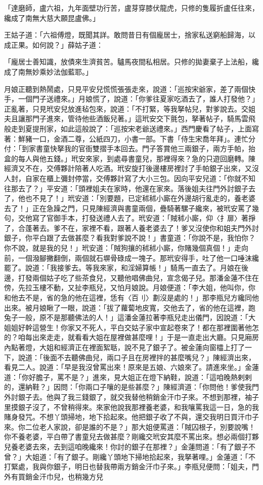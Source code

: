 「達磨師，盧六祖，九年面壁功行苦，盧芽穿膝伏龍虎，只修的隻履折盧任往來，纔成了南無大慈大願昆盧佛。」

王姑子道：「六祖傅燈，既聞其詳。敢問昔日有個龐居士，捨家私送窮船歸海，以成正果。如何說？」薛姑子道：

「龐居士善知識，放債來生濟貧苦。驢馬夜間私相居。只修的拋妻棄子上法船，纔成了南無妙乘妙法伽藍耶。」

月娘正聽到熱鬧處，只見平安兒慌慌張張走來，說道：「巡按宋爺家，差了兩個快手，一個門子送禮來。」月娘慌了，說道：「你爹往夏家吃酒去了，誰人打發他？」正亂著，只見玳安兒放進毡包來，說道：「不打緊，等我拏帖兒，對爹說去。交姐夫且讓那門子進來，管待他些酒飯兒著。」這玳安交下氈包，拏著帖子，騎馬雲飛般走到夏提刑家，如此這般說了：「巡按宋老爺送禮來。」西門慶看了帖子，上面寫著：鮮豬一口，金酒二尊，公紙四刀，小書一部。下書「侍生宋喬年拜」。連忙分付：「到家書童快拏我的官衙雙摺手本回去。門子答賞他三兩銀子，兩方手帕，抬盒的每人與他五錢。」玳安來家，到處尋書童兒，那裡得來？急的只遊回磨轉。陳經濟又不在，交傅夥計陪著人吃酒。玳安旋打後邊樓房裡討了手帕銀子出來，又沒人封，自家在櫃上彌封停當，交傅夥計寫了大小三包。因向平安兒道：「你就不知往那去了？」平安道：「頭裡姐夫在家時，他還在家來。落後姐夫往門外討銀子去了，他也不見了！」玳安道：「別要題，已定秫秫小廝在外邊胡行亂走的，養老婆去了！」正在急躁之門，只見陳經濟與書童兩個，疊騎著騾子纔來，被玳安罵了幾句，交他寫了官御手本，打發送禮人去了。玳安道：「賊秫小廝，仰〈扌扉〉著掙了，合蓬著去。爹不在，家裡不看，跟著人養老婆去了！爹又沒使你和姐夫門外討銀子，你平白跟了去做甚麼？看我對爹說不說！」書童道：「你說不是，我怕你？你不說，就是我的兒！」玳安道：「賊狗攘的秫秫小廝，你賭幾個真個！」走向前，一個潑腳撇翻倒，兩個就石塀骨碌成一塊子。那玳安得手，吐了他一口唾沫纔罷了。說道：「我接爹去。等我來家，和淫婦算帳！」騎馬一直去了。月娘在後邊，打發兩個姑子吃了些茶食兒，又聽他唱佛曲兒，宣念偈子兒。那潘金蓮不住在傍，先拉玉樓不動，又扯李瓶兒，又怕月娘說。月娘便道：「李大姐，他叫你，你和他去不是，省的急的他在這裡，恁有〈百刂〉劃沒是處的！」那李瓶兒方纔同他出來。被月娘瞅了一眼，說道：「拔了蘿蔔地皮寬，交他去了，省的他在這裡，跑兔子一般，原不是那聽佛法的人！」這潘金蓮拉著李瓶兒走出儀門，因說道：「大姐姐好幹這營生！你家又不死人，平白交姑子家中宣起卷來了！都在那裡圍著他怎的？咱每出來走走，就看看大姐在屋裡做甚麼哩！」于是一直走出大廳。只見廂房內點著燈，大姐和經濟正在裡面絮聒，說不見了銀子了。被金蓮向窗櫺上打了一下，說道：「後面不去聽佛曲兒，兩口子且在房裡拌的甚麼嘴兒？」陳經濟出來，看見二人。說道：「早是我沒曾罵出來！原來是五娘、六娘來了。請進來坐。」金蓮道：「你好膽子，罵不是？」進來，見大姐正在燈下納鞋，說道：「這咱晚熱剌剌的，還納鞋？」因問：「你兩口子嚷的是些甚麼？」陳經濟道：「你問他！爹使我門外討銀子去。他與了我三錢銀了，就交我替他稍銷金汗巾子來。不想到那裡，袖子里摸銀子沒了，不曾稍得來。來家他說我那裡養老婆，和我嚷罵我這一日，急的我賭身發咒。不想丫頭掃地，地下拾起來。他把銀子收了不與，還交我明日買汗巾子來。你二位老人家說，卻是誰的不是？」那大姐便罵道：「賊囚根子，別要說嘴！你不養老婆，平白帶了書童兒去做甚麼？剛纔交玳安其麼不罵出來。想必兩個打夥兒養老婆去來，去到這咱晚纔來！你討的銀子在那裡？」金蓮問道：「有了銀子不曾？」大姐道：「有了銀子。剛纔丫頭地下掃地拾起來，我拏著哩。」金蓮道：「不打緊處，我與你銀子，明日也替我帶兩方銷金汗巾子來。」李瓶兒便問：「姐夫，門外有買銷金汗巾兒，也稍幾方兒